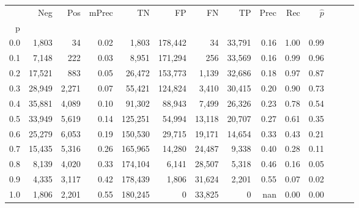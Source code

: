 \begin{tabular}{rrrrrrrrrrrrrr}
\toprule
{} &     Neg &    Pos & mPrec &       TN &       FP &      FN &      TP &  Prec &   Rec & $\hat{p}$ \\
p   &         &        &       &          &          &         &         &       &       &           \\
\midrule
0.0 &   1,803 &     34 &  0.02 &    1,803 &  178,442 &      34 &  33,791 &  0.16 &  1.00 &      0.99 \\
0.1 &   7,148 &    222 &  0.03 &    8,951 &  171,294 &     256 &  33,569 &  0.16 &  0.99 &      0.96 \\
0.2 &  17,521 &    883 &  0.05 &   26,472 &  153,773 &   1,139 &  32,686 &  0.18 &  0.97 &      0.87 \\
0.3 &  28,949 &  2,271 &  0.07 &   55,421 &  124,824 &   3,410 &  30,415 &  0.20 &  0.90 &      0.73 \\
0.4 &  35,881 &  4,089 &  0.10 &   91,302 &   88,943 &   7,499 &  26,326 &  0.23 &  0.78 &      0.54 \\
0.5 &  33,949 &  5,619 &  0.14 &  125,251 &   54,994 &  13,118 &  20,707 &  0.27 &  0.61 &      0.35 \\
0.6 &  25,279 &  6,053 &  0.19 &  150,530 &   29,715 &  19,171 &  14,654 &  0.33 &  0.43 &      0.21 \\
0.7 &  15,435 &  5,316 &  0.26 &  165,965 &   14,280 &  24,487 &   9,338 &  0.40 &  0.28 &      0.11 \\
0.8 &   8,139 &  4,020 &  0.33 &  174,104 &    6,141 &  28,507 &   5,318 &  0.46 &  0.16 &      0.05 \\
0.9 &   4,335 &  3,117 &  0.42 &  178,439 &    1,806 &  31,624 &   2,201 &  0.55 &  0.07 &      0.02 \\
1.0 &   1,806 &  2,201 &  0.55 &  180,245 &        0 &  33,825 &       0 &   nan &  0.00 &      0.00 \\
\bottomrule
\end{tabular}
